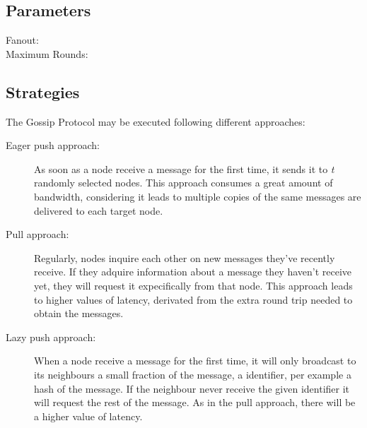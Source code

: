 

\subsection{Parameters}
\label{subsec:parameters}
\begin{description}
    \item[Fanout:]
    \item[Maximum Rounds:]
\end{description}

\subsection{Strategies}
\label{subsec:strategies}
The Gossip Protocol may be executed following different approaches\cite{Karp2000}:
\begin{description}
    \item[Eager push approach:] As soon as a node receive a message for the first time,
        it sends it to \textit{t} randomly selected nodes. This approach consumes a great
        amount of bandwidth, considering it leads to multiple copies of the same messages
        are delivered to each target node.
    \item[Pull approach:] Regularly, nodes inquire each other on new messages they've
        recently receive. If they adquire information about a message they haven't receive
        yet, they will request it expecifically from that node. This approach leads to higher
        values of latency, derivated from the extra round trip needed to obtain the messages.
    \item[Lazy push approach:] When a node receive a message for the first time, it will only
        broadcast to its neighbours a small fraction of the message, a identifier, per example
        a hash of the message. If the neighbour never receive the given identifier it will request
        the rest of the message. As in the pull approach, there will be a higher value of latency.
\end{description}

